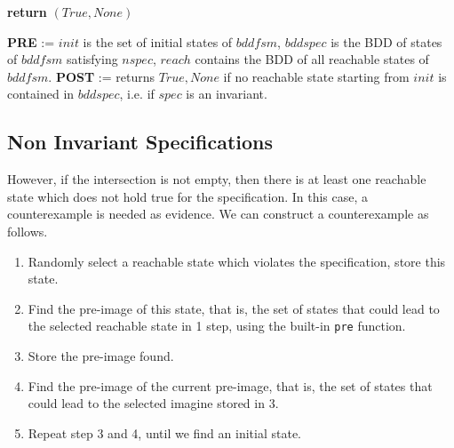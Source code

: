 \medskip

\begin{algorithmic}[1]
	\State \textbf{return }$(True, None)$
\EndIf
\item[]
\State \textbf{PRE} := $init$ is the set of initial states of $bddfsm$, $bddspec$ is the BDD of states of $bddfsm$ satisfying $nspec$, $reach$ contains the BDD of all reachable states of $bddfsm$.
\State \textbf{POST} := returns $True, None$ if no reachable state starting from  
$init$ is contained in $bddspec$, i.e. if $spec$ is an invariant.
\end{algorithmic}

\subsection{Non Invariant Specifications} \label{subsec:noninv}

However, if the intersection is not empty, then there is at least one reachable state which does not hold true for the specification. In this case, a counterexample is needed as evidence. We can construct a counterexample as follows.

\begin{enumerate}
	\item Randomly select a reachable state which violates the specification, store this state.
	\item Find the pre-image of this state, that is, the set of states that could lead to the selected reachable state in 1 step, using the built-in \texttt{pre} function.
	\item Store the pre-image found.
	\item Find the pre-image of the current pre-image, that is, the set of states that could lead to the selected imagine stored in 3.
	\item Repeat step 3 and 4, until we find an initial state.
\end{enumerate}

\medskip

